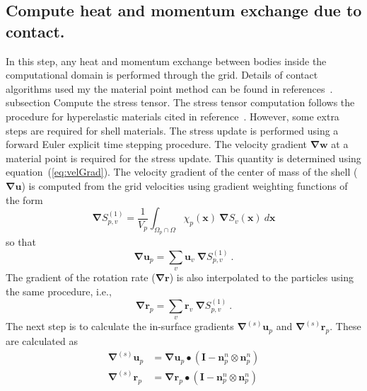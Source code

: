     \subsection{ Compute heat and momentum exchange due to contact.}
      In this step, any heat and momentum exchange between bodies inside the
      computational domain is performed through the grid.  Details of 
      contact algorithms used my the material point method can be found in
      references~\cite{Sulsky1994, Bard2000, Bard2001}.
    subsection{ Compute the stress tensor.}
      The stress tensor computation follows the procedure for hyperelastic
      materials cited in reference~\cite{Simo1998}.  However, some extra steps
      are required for shell materials.  The stress update is performed using 
      a forward Euler explicit time stepping procedure.  The velocity 
      gradient $\boldsymbol{\nabla}\mathbf{w}$ at a material point is required 
      for the stress update.  This quantity is determined using 
      equation~(\ref{eq:velGrad}).  The velocity gradient of the center
      of mass of the shell ($\boldsymbol{\nabla}\mathbf{u}$) is computed from 
      the grid velocities using gradient weighting functions of the form
      \begin{equation}
        \boldsymbol{\nabla} S^{(1)}_{p,v} = \frac{1}{V_p}
          \int_{\Omega_p\cap\Omega} \chi_p(\mathbf{x})~
            \boldsymbol{\nabla} S_v(\mathbf{x})~d{\mathbf{x}}
      \end{equation}
      so that
      \begin{equation}      
        \boldsymbol{\nabla}\mathbf{u}_p = \sum_v\mathbf{u}_v~
          \boldsymbol{\nabla} S^{(1)}_{p,v}~.
      \end{equation}      
      The gradient of the rotation rate ($\boldsymbol{\nabla}\mathbf{r}$) is
      also interpolated to the particles using the same procedure, i.e.,
      \begin{equation}      
        \boldsymbol{\nabla}\mathbf{r}_p = \sum_v\mathbf{r}_v~
          \boldsymbol{\nabla} S^{(1)}_{p,v}~.
      \end{equation}      
      The next step is to calculate the in-surface gradients 
      $\boldsymbol{\nabla}^{(s)}\mathbf{u}_p$ and 
      $\boldsymbol{\nabla}^{(s)}\mathbf{r}_p$.  These are calculated as
      \begin{eqnarray}
        \boldsymbol{\nabla}^{(s)}\mathbf{u}_p &=
          \boldsymbol{\nabla}\mathbf{u}_p \bullet 
          \left(\mathbf{I} - \mathbf{n}^n_p\otimes\mathbf{n}^n_p\right) \\
        \boldsymbol{\nabla}^{(s)}\mathbf{r}_p &=
          \boldsymbol{\nabla}\mathbf{r}_p \bullet 
          \left(\mathbf{I} - \mathbf{n}^n_p\otimes\mathbf{n}^n_p\right)
      \end{eqnarray}
